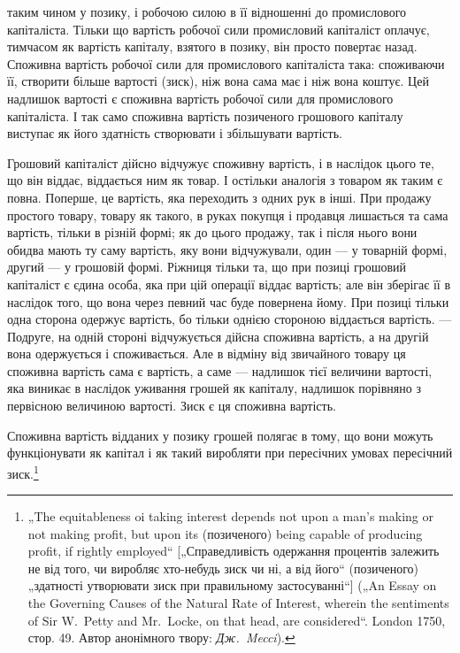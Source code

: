 \parcont{}  %
таким чином у позику, і робочою силою в її відношенні до промислового
капіталіста. Тільки що вартість робочої сили промисловий
капіталіст оплачує, тимчасом як вартість капіталу, взятого
в позику, він просто повертає назад. Споживна вартість робочої
сили для промислового капіталіста така: споживаючи її, створити
більше вартості (зиск), ніж вона сама має і ніж вона коштує.
Цей надлишок вартості є споживна вартість робочої сили для
промислового капіталіста. І так само споживна вартість позиченого
грошового капіталу виступає як його здатність створювати
і збільшувати вартість.

Грошовий капіталіст дійсно відчужує споживну вартість, і в наслідок
цього те, що він віддає, віддається ним як товар. І остільки
аналогія з товаром як таким є повна. Поперше, це вартість, яка
переходить з одних рук в інші. При продажу простого товару,
товару як такого, в руках покупця і продавця лишається та сама
вартість, тільки в різній формі; як до цього продажу, так і після
нього вони обидва мають ту саму вартість, яку вони відчужували,
один — у товарній формі, другий — у грошовій формі. Ріжниця
тільки та, що при позиці грошовий капіталіст є єдина особа, яка
при цій операції віддає вартість; але він зберігає її в наслідок того,
що вона через певний час буде повернена йому. При позиці тільки
одна сторона одержує вартість, бо тільки однією стороною віддається
вартість. — Подруге, на одній стороні відчужується дійсна
споживна вартість, а на другій вона одержується і споживається.
Але в відміну від звичайного товару ця споживна вартість сама є
вартість, а саме — надлишок тієї величини вартості, яка виникає
в наслідок уживання грошей як капіталу, надлишок порівняно з
первісною величиною вартості. Зиск є ця споживна вартість.

Споживна вартість відданих у позику грошей полягає в тому,
що вони можуть функціонувати як капітал і як такий виробляти
при пересічних умовах пересічний зиск.\footnote{
„The equitableness oi taking interest depends not upon a man’s making or
not making profit, but upon its (позиченого) being capable of producing profit, if
rightly employed“ [„Справедливість одержання процентів залежить не від того, чи
виробляє хто-небудь зиск чи ні, а від його“ (позиченого) „здатності утворювати
зиск при правильному застосуванні“] („An Essay on the Governing Causes of
the Natural Rate of Interest, wherein the sentiments of Sir W.~Petty and
Mr.~Locke, on that head, are considered“. London 1750, стор. 49. Автор анонімного
твору: \emph{Дж.~Mecci}).
}

